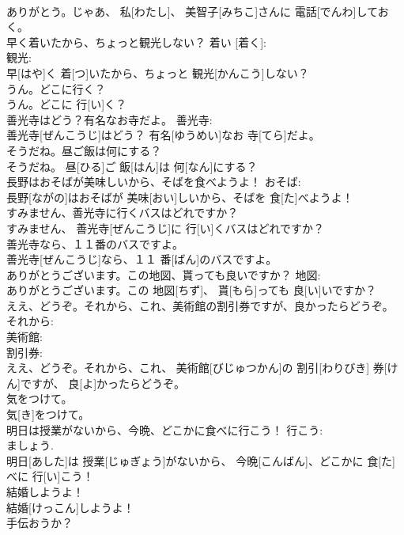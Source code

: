 \documentclass[8pt]{extreport}
\begin{document}
\begin{CJK}{UTF8}{min}
\\	ありがとう。じゃあ、 私[わたし]、 美智子[みちこ]さんに 電話[でんわ]しておく。	
\\	早く着いたから、ちょっと観光しない？	着い [着く]: 
\\	観光: 
\\	早[はや]く 着[つ]いたから、ちょっと 観光[かんこう]しない？	
\\	うん。どこに行く？	
\\	うん。どこに 行[い]く？	
\\	善光寺はどう？有名なお寺だよ。	善光寺: 
\\	善光寺[ぜんこうじ]はどう？ 有名[ゆうめい]なお 寺[てら]だよ。	
\\	そうだね。昼ご飯は何にする？	
\\	そうだね。 昼[ひる]ご 飯[はん]は 何[なん]にする？	
\\	長野はおそばが美味しいから、そばを食べようよ！	おそば: 
\\	長野[ながの]はおそばが 美味[おい]しいから、そばを 食[た]べようよ！	
\\	すみません、善光寺に行くバスはどれですか？	
\\	すみません、 善光寺[ぜんこうじ]に 行[い]くバスはどれですか？	
\\	善光寺なら、１１番のバスですよ。	
\\	善光寺[ぜんこうじ]なら、１１ 番[ばん]のバスですよ。	
\\	ありがとうございます。この地図、貰っても良いですか？	地図: 
\\	ありがとうございます。この 地図[ちず]、 貰[もら]っても 良[い]いですか？	
\\	ええ、どうぞ。それから、これ、美術館の割引券ですが、良かったらどうぞ。	それから: 
\\	美術館: 
\\	割引券: 
\\	ええ、どうぞ。それから、これ、 美術館[びじゅつかん]の 割引[わりびき] 券[けん]ですが、 良[よ]かったらどうぞ。	
\\	気をつけて。	
\\	気[き]をつけて。		
\\	明日は授業がないから、今晩、どこかに食べに行こう！	行こう: 
\\	ましょう. 
\\	明日[あした]は 授業[じゅぎょう]がないから、 今晩[こんばん]、どこかに 食[た]べに 行[い]こう！	
\\	結婚しようよ！	
\\	結婚[けっこん]しようよ！	
\\	手伝おうか？	

\end{CJK}
\end{document}

